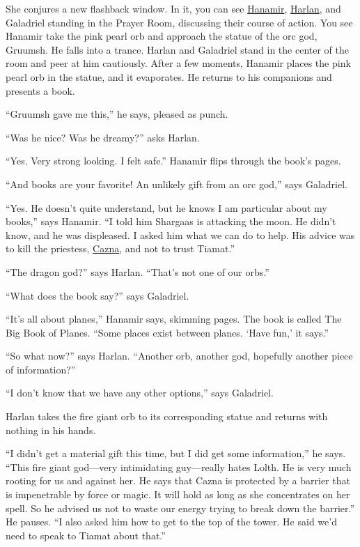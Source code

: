 \documentclass[smalldemyvopaper,11pt,twoside,onecolumn,openright,extrafontsizes]{memoir}
\begin{document}
She conjures a new flashback window. In it, you can see
\href{/characters/hanamir/}{Hanamir},
\href{/characters/harlan/}{Harlan}, and Galadriel standing in the Prayer
Room, discussing their course of action. You see Hanamir take the pink
pearl orb and approach the statue of the orc god, Gruumsh. He falls into
a trance. Harlan and Galadriel stand in the center of the room and peer
at him cautiously. After a few moments, Hanamir places the pink pearl
orb in the statue, and it evaporates. He returns to his companions and
presents a book.

``Gruumsh gave me this,'' he says, pleased as punch.

``Was he nice? Was he dreamy?'' asks Harlan.

``Yes. Very strong looking. I felt safe.'' Hanamir flips through the
book's pages.

``And books are your favorite! An unlikely gift from an orc god,'' says
Galadriel.

``Yes. He doesn't quite understand, but he knows I am particular about
my books,'' says Hanamir. ``I told him Shargaas is attacking the moon.
He didn't know, and he was displeased. I asked him what we can do to
help. His advice was to kill the priestess,
\href{/characters/cazna/}{Cazna}, and not to trust Tiamat.''

``The dragon god?'' says Harlan. ``That's not one of our orbs.''

``What does the book say?'' says Galadriel.

``It's all about planes,'' Hanamir says, skimming pages. The book is
called The Big Book of Planes. ``Some places exist between planes. `Have
fun,' it says.''

``So what now?'' says Harlan. ``Another orb, another god, hopefully
another piece of information?''

``I don't know that we have any other options,'' says Galadriel.

Harlan takes the fire giant orb to its corresponding statue and returns
with nothing in his hands.

``I didn't get a material gift this time, but I did get some
information,'' he says. ``This fire giant god---very intimidating
guy---really hates Lolth. He is very much rooting for us and against
her. He says that Cazna is protected by a barrier that is impenetrable
by force or magic. It will hold as long as she concentrates on her
spell. So he advised us not to waste our energy trying to break down the
barrier.'' He pauses. ``I also asked him how to get to the top of the
tower. He said we'd need to speak to Tiamat about that.''
\end{document}
